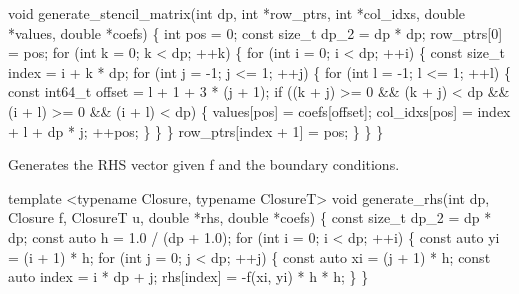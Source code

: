 \begin{DoxyCode}
\textcolor{keywordtype}{void} generate\_stencil\_matrix(\textcolor{keywordtype}{int} dp, \textcolor{keywordtype}{int} *row\_ptrs, \textcolor{keywordtype}{int} *col\_idxs,
                             \textcolor{keywordtype}{double} *values, \textcolor{keywordtype}{double} *coefs)
\{
    \textcolor{keywordtype}{int} pos = 0;
    \textcolor{keyword}{const} \textcolor{keywordtype}{size\_t} dp\_2 = dp * dp;
    row\_ptrs[0] = pos;
    \textcolor{keywordflow}{for} (\textcolor{keywordtype}{int} k = 0; k < dp; ++k) \{
        \textcolor{keywordflow}{for} (\textcolor{keywordtype}{int} i = 0; i < dp; ++i) \{
            \textcolor{keyword}{const} \textcolor{keywordtype}{size\_t} index = i + k * dp;
            \textcolor{keywordflow}{for} (\textcolor{keywordtype}{int} j = -1; j <= 1; ++j) \{
                \textcolor{keywordflow}{for} (\textcolor{keywordtype}{int} l = -1; l <= 1; ++l) \{
                    \textcolor{keyword}{const} int64\_t offset = l + 1 + 3 * (j + 1);
                    \textcolor{keywordflow}{if} ((k + j) >= 0 && (k + j) < dp && (i + l) >= 0 &&
                        (i + l) < dp) \{
                        values[pos] = coefs[offset];
                        col\_idxs[pos] = index + l + dp * j;
                        ++pos;
                    \}
                \}
            \}
            row\_ptrs[index + 1] = pos;
        \}
    \}
\}
\end{DoxyCode}


Generates the R\+HS vector given {\ttfamily f} and the boundary conditions.


\begin{DoxyCode}
\textcolor{keyword}{template} <\textcolor{keyword}{typename} Closure, \textcolor{keyword}{typename} ClosureT>
\textcolor{keywordtype}{void} generate\_rhs(\textcolor{keywordtype}{int} dp, Closure f, ClosureT u, \textcolor{keywordtype}{double} *rhs, \textcolor{keywordtype}{double} *coefs)
\{
    \textcolor{keyword}{const} \textcolor{keywordtype}{size\_t} dp\_2 = dp * dp;
    \textcolor{keyword}{const} \textcolor{keyword}{auto} h = 1.0 / (dp + 1.0);
    \textcolor{keywordflow}{for} (\textcolor{keywordtype}{int} i = 0; i < dp; ++i) \{
        \textcolor{keyword}{const} \textcolor{keyword}{auto} yi = (i + 1) * h;
        \textcolor{keywordflow}{for} (\textcolor{keywordtype}{int} j = 0; j < dp; ++j) \{
            \textcolor{keyword}{const} \textcolor{keyword}{auto} xi = (j + 1) * h;
            \textcolor{keyword}{const} \textcolor{keyword}{auto} index = i * dp + j;
            rhs[index] = -f(xi, yi) * h * h;
        \}
    \}
\end{DoxyCode}


